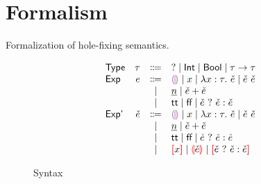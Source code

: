 \documentclass{article}
\begin{document}
\section{Formalism}
Formalization of hole-fixing semantics.

\begin{figure}
  \[\begin{array}{lrcl}
    \textsf{Type} & \TMV  & \Coloneqq & \TUnknown \mid \TInt \mid \TBool \mid \TFun{\TMV}{\TMV} \\
    \textsf{Exp }  & \EMV  & \Coloneqq & \ECEHole \mid x \mid \ECLam{x}{\TMV}{\ECMV} \mid \ECAp{\ECMV}{\ECMV} \\
         &       & \mid         & \ECIntMV \mid \ECPlus{\ECMV}{\ECMV} \\
         &       & \mid         & \ECTrue \mid \ECFalse \mid \ECIf{\ECMV}{\ECMV}{\ECMV} \\
    \textsf{Exp'} & \ECMV & \Coloneqq & \ECEHole \mid x \mid \ECLam{x}{\TMV}{\ECMV} \mid \ECAp{\ECMV}{\ECMV} \\
         &       & \mid         & \ECIntMV \mid \ECPlus{\ECMV}{\ECMV} \\
         &       & \mid         & \ECTrue \mid \ECFalse \mid \ECIf{\ECMV}{\ECMV}{\ECMV} \\
         &       & \mid         & \ECUnbound{x} \mid \ECInconType{\ECMV} \mid \ECInconBr{\ECMV}{\ECMV}{\ECMV}
  \end{array}\]
  \caption{Syntax}
  \label{fig:internal-syntax}
\end{figure}
\end{document}

